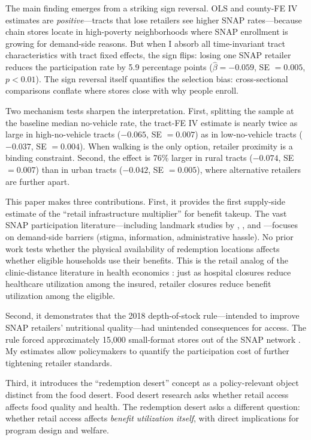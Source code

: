\documentclass[12pt]{article}
\begin{document}
The main finding emerges from a striking sign reversal. OLS and county-FE IV estimates are \textit{positive}---tracts that lose retailers see higher SNAP rates---because chain stores locate in high-poverty neighborhoods where SNAP enrollment is growing for demand-side reasons. But when I absorb all time-invariant tract characteristics with tract fixed effects, the sign flips: losing one SNAP retailer reduces the participation rate by 5.9 percentage points ($\hat{\beta} = -0.059$, SE $= 0.005$, $p < 0.01$). The sign reversal itself quantifies the selection bias: cross-sectional comparisons conflate where stores close with why people enroll.

Two mechanism tests sharpen the interpretation. First, splitting the sample at the baseline median no-vehicle rate, the tract-FE IV estimate is nearly twice as large in high-no-vehicle tracts ($-0.065$, SE $= 0.007$) as in low-no-vehicle tracts ($-0.037$, SE $= 0.004$). When walking is the only option, retailer proximity is a binding constraint. Second, the effect is 76\% larger in rural tracts ($-0.074$, SE $= 0.007$) than in urban tracts ($-0.042$, SE $= 0.005$), where alternative retailers are further apart.

This paper makes three contributions. First, it provides the first supply-side estimate of the ``retail infrastructure multiplier'' for benefit takeup. The vast SNAP participation literature---including landmark studies by \citet{currie2003}, \citet{finkelstein2019}, and \citet{ganong2018}---focuses on demand-side barriers (stigma, information, administrative hassle). No prior work tests whether the physical availability of redemption locations affects whether eligible households use their benefits. This is the retail analog of the clinic-distance literature in health economics \citep{buchmueller2005}: just as hospital closures reduce healthcare utilization among the insured, retailer closures reduce benefit utilization among the eligible.

Second, it demonstrates that the 2018 depth-of-stock rule---intended to improve SNAP retailers' nutritional quality---had unintended consequences for access. The rule forced approximately 15,000 small-format stores out of the SNAP network \citep{usda2023}. My estimates allow policymakers to quantify the participation cost of further tightening retailer standards.

Third, it introduces the ``redemption desert'' concept as a policy-relevant object distinct from the food desert. Food desert research \citep{allcott2019, handbury2015} asks whether retail access affects food quality and health. The redemption desert asks a different question: whether retail access affects \textit{benefit utilization itself}, with direct implications for program design and welfare.
\end{document}
